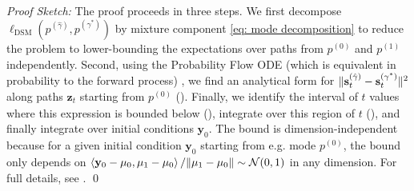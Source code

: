 \documentclass[11pt]{article}
\newcommand{\becca}[1]{\textcolor{dkred}{[becca: #1]}}
\newcommand{\inprod}[1]{\left\langle#1\right\rangle}
\newcommand{\vect}[1]{\mathbf{#1}}
\theoremstyle{plain}
\newcommand{\1}{\mathbbm{1}}
\DeclarePairedDelimiter{\norm}{\lVert}{\rVert}
\newcommand{\ldsm}{\ell_\mathrm{DSM}}
\newcommand{\pdist}[2][]{p_{#1}^{(#2)}}
\newcommand{\score}[2][]{\vect{s}_{#1}^{(#2)}}
\begin{document}
\emph{Proof Sketch:}
The proof proceeds in three steps. We first decompose $\ldsm(\pdist{\hat\gamma}, \pdist{\gamma^*})$ by mixture component \eqref{eq: mode decomposition} to reduce the problem to lower-bounding the expectations over paths from $\pdist{0}$ and $\pdist{1}$ independently. Second, using the Probability Flow ODE (which is equivalent in probability to the forward process) \citep{song2021scorebasedgenerativemodelingstochastic}, we find an analytical form for $\norm{\score[t]{\hat\gamma}-\score[t]{\gamma^*}}^2$ along paths $\vect{z}_t$ starting from $\pdist{0}$ (). Finally, we identify the interval of $t$ values where this expression is bounded below (), integrate over this region of $t$ (), and finally integrate over initial conditions $\vect {y} _ {0} $. The bound is dimension-independent because for a given initial condition $\vect {y}_{0} $ starting from e.g. mode $\pdist{0}$, the bound only depends on $\inprod{\vect y_0-\mu_0, \mu_1-\mu_0}/\norm{\mu_1-\mu_0}\sim \mathcal{N}(0,1)$ in any dimension. For full details, see .
\qed
\end{document}
